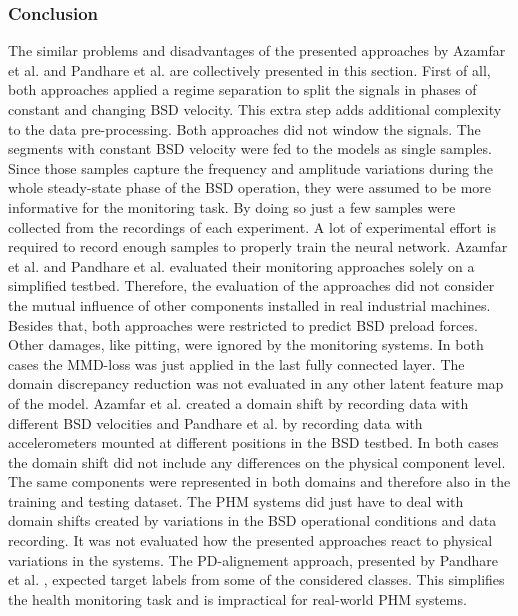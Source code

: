 \subsubsection{Conclusion}
The similar problems and disadvantages of the presented approaches by Azamfar et al. \cite{AZAMFAR2020103932} and Pandhare et al. \cite{Pandhare2021} are collectively presented in this section. First of all, both approaches applied a regime separation to split the signals in phases of constant and changing BSD velocity. This extra step adds additional complexity to the data pre-processing. Both approaches did not window the signals. The segments with constant BSD velocity were fed to the models as single samples. Since those samples capture the frequency and amplitude variations during the whole steady-state phase of the BSD operation, they were assumed to be more informative for the monitoring task. By doing so just a few samples were collected from the recordings of each experiment. A lot of experimental effort is required to record enough samples to properly train the neural network. Azamfar et al. \cite{AZAMFAR2020103932} and  Pandhare et al. \cite{Pandhare2021} evaluated their monitoring approaches solely on a simplified testbed. Therefore, the evaluation of the approaches did not consider the mutual influence of other components installed in real industrial machines. Besides that, both approaches were restricted to predict BSD preload forces. Other damages, like pitting, were ignored by the monitoring systems. In both cases the MMD-loss was just applied in the last fully connected layer. The domain discrepancy reduction was not evaluated in any other latent feature map of the model. Azamfar et al. \cite{AZAMFAR2020103932} created a domain shift by recording data with different BSD velocities and Pandhare et al. \cite{Pandhare2021} by recording data with accelerometers mounted at different positions in the BSD testbed. In both cases the domain shift did not include any differences on the physical component level. The same components were represented in both domains and therefore also in the training and testing dataset. The PHM systems did just have to deal with domain shifts created by variations in the BSD operational conditions and data recording. It was not evaluated how the presented approaches react to physical variations in the systems. The PD-alignement approach, presented by Pandhare et al. \cite{Pandhare2021}, expected target labels from some of the considered classes. This simplifies the health monitoring task and is impractical for real-world PHM systems.

